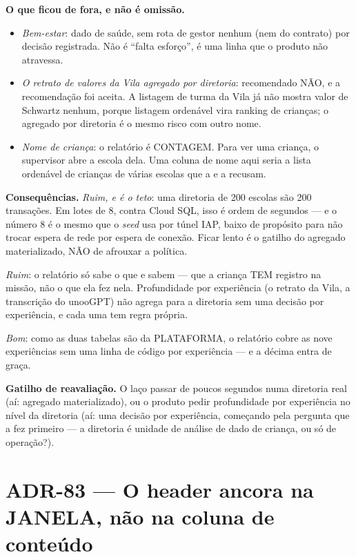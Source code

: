 \textbf{O que ficou de fora, e não é omissão.}
\begin{itemize}
  \item \emph{Bem-estar}: dado de saúde, sem rota de gestor nenhum (nem do
    contrato) por decisão registrada. Não é \enquote{falta esforço}, é uma linha
    que o produto não atravessa.
  \item \emph{O retrato de valores da Vila agregado por diretoria}: recomendado
    NÃO, e a recomendação foi aceita. A listagem de turma da Vila já não mostra
    valor de Schwartz nenhum, porque listagem ordenável vira ranking de
    crianças; o agregado por diretoria é o mesmo risco com outro nome.
  \item \emph{Nome de criança}: o relatório é CONTAGEM. Para ver uma criança, o
    supervisor abre a escola dela. Uma coluna de nome aqui seria a lista
    ordenável de crianças de várias escolas que a  e a 
    recusam.
\end{itemize}

\textbf{Consequências.} \emph{Ruim, e é o teto}: uma diretoria de 200 escolas são
200 transações. Em lotes de 8, contra Cloud SQL, isso é ordem de segundos --- e o
número 8 é o mesmo que o \emph{seed} usa por túnel IAP, baixo de propósito para
não trocar espera de rede por espera de conexão. Ficar lento é o gatilho do
agregado materializado, NÃO de afrouxar a política.

\emph{Ruim}: o relatório só sabe o que  e  sabem ---
que a criança TEM registro na missão, não o que ela fez nela. Profundidade por
experiência (o retrato da Vila, a transcrição do unooGPT) não agrega para a
diretoria sem uma decisão por experiência, e cada uma tem regra própria.

\emph{Bom}: como as duas tabelas são da PLATAFORMA, o relatório cobre as nove
experiências sem uma linha de código por experiência --- e a décima entra de
graça.

\textbf{Gatilho de reavaliação.} O laço passar de poucos segundos numa diretoria
real (aí: agregado materializado), ou o produto pedir profundidade por
experiência no nível da diretoria (aí: uma decisão por experiência, começando
pela pergunta que a  fez primeiro --- a diretoria é unidade de
análise de dado de criança, ou só de operação?).

\section{ADR-83 --- O header ancora na JANELA, não na coluna de conteúdo}
\label{adr:header-ancora-na-janela}

